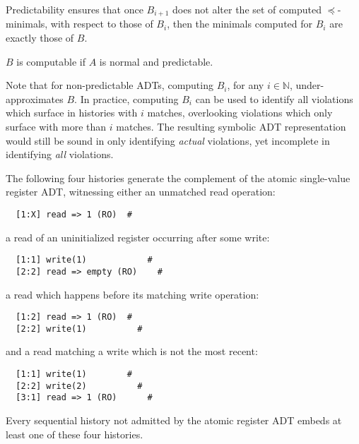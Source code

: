 Predictability ensures that once $B_{i+1}$ does not alter the set of computed
$\preceq$-minimals, with respect to those of $B_i$, then the minimals computed
for $B_i$ are exactly those of $B$.

\begin{lemma}

  $B$ is computable if $A$ is normal and predictable.

\end{lemma}

Note that for non-predictable ADTs, computing $B_i$, for any $i \in
\mathbb{N}$, under-approximates $B$. In practice, computing $B_i$ can be used
to identify all violations which surface in histories with $i$ matches,
overlooking violations which only surface with more than $i$ matches. The
resulting symbolic ADT representation would still be sound in only identifying
\emph{actual} violations, yet incomplete in identifying \emph{all} violations.

\begin{example}
  \label{ex:patterns}

  The following four histories generate the complement of the atomic
  single-value register ADT, witnessing either an unmatched read operation:
\begin{verbatim}
  [1:X] read => 1 (RO)  #
\end{verbatim}
  a read of an uninitialized register occurring after some write:
\begin{verbatim}
  [1:1] write(1)            #
  [2:2] read => empty (RO)    #
\end{verbatim}
  a read which happens before its matching write operation:
\begin{verbatim}
  [1:2] read => 1 (RO)  #
  [2:2] write(1)          #
\end{verbatim}
  and a read matching a write which is not the most recent:
\begin{verbatim}
  [1:1] write(1)        #
  [2:2] write(2)          #
  [3:1] read => 1 (RO)      #
\end{verbatim}
  Every sequential history not admitted by the atomic register ADT embeds at
  least one of these four histories.
  
\end{example}
